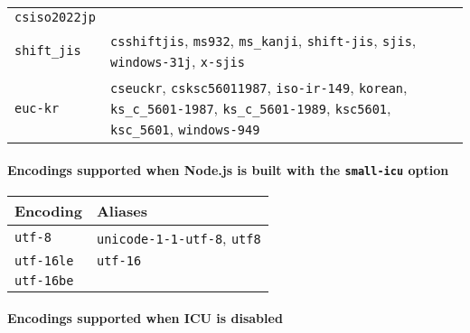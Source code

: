 \begin{longtable}[]{@{}
  >{\raggedright\arraybackslash}p{}
  >{\raggedright\arraybackslash}p{}@{}}
\texttt{\textquotesingle{}csiso2022jp\textquotesingle{}} \\
\texttt{\textquotesingle{}shift\_jis\textquotesingle{}} &
\texttt{\textquotesingle{}csshiftjis\textquotesingle{}},
\texttt{\textquotesingle{}ms932\textquotesingle{}},
\texttt{\textquotesingle{}ms\_kanji\textquotesingle{}},
\texttt{\textquotesingle{}shift-jis\textquotesingle{}},
\texttt{\textquotesingle{}sjis\textquotesingle{}},
\texttt{\textquotesingle{}windows-31j\textquotesingle{}},
\texttt{\textquotesingle{}x-sjis\textquotesingle{}} \\
\texttt{\textquotesingle{}euc-kr\textquotesingle{}} &
\texttt{\textquotesingle{}cseuckr\textquotesingle{}},
\texttt{\textquotesingle{}csksc56011987\textquotesingle{}},
\texttt{\textquotesingle{}iso-ir-149\textquotesingle{}},
\texttt{\textquotesingle{}korean\textquotesingle{}},
\texttt{\textquotesingle{}ks\_c\_5601-1987\textquotesingle{}},
\texttt{\textquotesingle{}ks\_c\_5601-1989\textquotesingle{}},
\texttt{\textquotesingle{}ksc5601\textquotesingle{}},
\texttt{\textquotesingle{}ksc\_5601\textquotesingle{}},
\texttt{\textquotesingle{}windows-949\textquotesingle{}} \\
\end{longtable}

\paragraph{\texorpdfstring{Encodings supported when Node.js is built
with the \texttt{small-icu}
option}{Encodings supported when Node.js is built with the small-icu option}}\label{encodings-supported-when-node.js-is-built-with-the-small-icu-option}

\begin{longtable}[]{@{}ll@{}}
\toprule\noalign{}
Encoding & Aliases \\
\midrule\noalign{}
\endhead
\bottomrule\noalign{}
\endlastfoot
\texttt{\textquotesingle{}utf-8\textquotesingle{}} &
\texttt{\textquotesingle{}unicode-1-1-utf-8\textquotesingle{}},
\texttt{\textquotesingle{}utf8\textquotesingle{}} \\
\texttt{\textquotesingle{}utf-16le\textquotesingle{}} &
\texttt{\textquotesingle{}utf-16\textquotesingle{}} \\
\texttt{\textquotesingle{}utf-16be\textquotesingle{}} & \\
\end{longtable}

\paragraph{Encodings supported when ICU is
disabled}\label{encodings-supported-when-icu-is-disabled}

